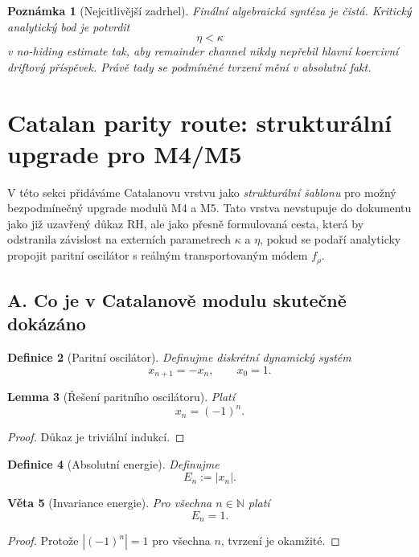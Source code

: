 \documentclass[11pt,a4paper]{article}
\newtheorem{theorem}{Věta}[section]
\newtheorem{lemma}[theorem]{Lemma}
\newtheorem{definition}[theorem]{Definice}
\newtheorem{remark}[theorem]{Poznámka}
\begin{document}
\begin{remark}[Nejcitlivější zadrhel]
Finální algebraická syntéza je čistá. Kritický analytický bod je potvrdit
\[
\eta<\kappa
\]
v no-hiding estimate tak, aby remainder channel nikdy nepřebil hlavní koercivní driftový příspěvek.
Právě tady se podmíněné tvrzení mění v absolutní fakt.
\end{remark}


\section{Catalan parity route: strukturální upgrade pro M4/M5}

V této sekci přidáváme Catalanovu vrstvu jako \emph{strukturální šablonu} pro možný
bezpodmínečný upgrade modulů M4 a M5. Tato vrstva nevstupuje do dokumentu jako již uzavřený
důkaz RH, ale jako přesně formulovaná cesta, která by odstranila závislost na externích
parametrech \(\kappa\) a \(\eta\), pokud se podaří analyticky propojit paritní oscilátor s reálným
transportovaným módem \(f_\rho\).

\subsection*{A. Co je v Catalanově modulu skutečně dokázáno}

\begin{definition}[Paritní oscilátor]
Definujme diskrétní dynamický systém
\[
x_{n+1}=-x_n,\qquad x_0=1.
\]
\end{definition}

\begin{lemma}[Řešení paritního oscilátoru]
Platí
\[
x_n=(-1)^n.
\]
\end{lemma}

\begin{proof}
Důkaz je triviální indukcí.
\end{proof}

\begin{definition}[Absolutní energie]
Definujme
\[
E_n:=|x_n|.
\]
\end{definition}

\begin{theorem}[Invariance energie]
Pro všechna \(n\in\mathbb{N}\) platí
\[
E_n=1.
\]
\end{theorem}

\begin{proof}
Protože \(|(-1)^n|=1\) pro všechna \(n\), tvrzení je okamžité.
\end{proof}
\end{document}
